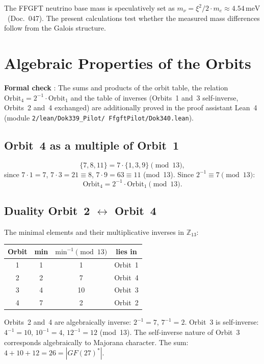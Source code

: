 The FFGFT neutrino base mass is speculatively set as
$m_\nu=\xi^2/2\cdot m_e\approx4.54\,\text{meV}$ \SM\ (Doc.~047).
The present calculations test whether the measured mass differences
follow from the Galois structure.

\section{Algebraic Properties of the Orbits \BM\,\LM}

\noindent\textbf{Formal check} \LM: The sums and products of the orbit table,
the relation $\text{Orbit}_4=2^{-1}\cdot\text{Orbit}_1$ and the table of
inverses (Orbits~1 and~3 self-inverse, Orbits~2 and~4 exchanged) are
additionally proved in the proof assistant Lean~4 (module
\texttt{2/\allowbreak lean/\allowbreak Dok339\_Pilot/\allowbreak
FfgftPilot/\allowbreak Dok340.lean}).

\subsection{Orbit~4 as a multiple of Orbit~1}

\[
\{7,8,11\}=7\cdot\{1,3,9\}\pmod{13},
\]
since $7\cdot1=7$, $7\cdot3=21\equiv8$, $7\cdot9=63\equiv11$ (mod~13).
Since $2^{-1}\equiv7\pmod{13}$:
\[
\boxed{\text{Orbit}_4=2^{-1}\cdot\text{Orbit}_1\pmod{13}.}
\]

\subsection{Duality Orbit~2 $\leftrightarrow$ Orbit~4}

The minimal elements and their multiplicative inverses in
$\mathbb{Z}_{13}$:

\begin{center}
\begin{tabular}{cccc}
\toprule
Orbit & min & $\text{min}^{-1}\!\pmod{13}$ & lies in \\
\midrule
1 & 1 & 1 & Orbit~1 \\
2 & 2 & 7 & Orbit~4 \\
3 & 4 & 10 & Orbit~3 \\
4 & 7 & 2 & Orbit~2 \\
\bottomrule
\end{tabular}
\end{center}

Orbits~2 and~4 are algebraically inverse: $2^{-1}=7$, $7^{-1}=2$.
Orbit~3 is self-inverse: $4^{-1}=10$, $10^{-1}=4$, $12^{-1}=12$
(mod~13). The self-inverse nature of Orbit~3 corresponds algebraically
to Majorana character. The sum: $4+10+12=26=|GF(27)^*|$.

